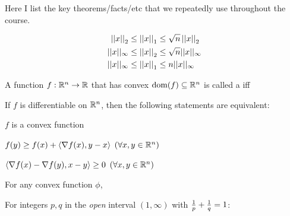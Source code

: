\documentclass[11pt]{article}
\renewcommand\vec[2][]{\bm{#2}_{#1}}
\begin{document}

Here I list the key theorems/facts/etc that we repeatedly use throughout the course. 

\begin{definition}
	\begin{align}
		\norm{x}
			&\leq \norm[1]{x} \leq \sqrt{n} \norm{x} \\
		\inftynorm{x} 
			&\leq \norm{x} \leq \sqrt{n}\inftynorm{x} \\
		\inftynorm{x} 
			&\leq \norm[1]{x} \leq n \inftynorm{x} \\
	\end{align}
\end{definition}

\begin{definition}
	A function $f : \R^n \to \R$ that has convex $\text{dom}(f) \subseteq \R^n$ is called a  iff

	If $f$ is differentiable on $\R^n$, then the following statements are equivalent:
	\begin{compactitem}
		\item $f$ is a convex function 
		
		\item $f(y) \geq f(x) + \innerprod{\nabla f(x)}{y - x}$ $(\forall x, y \in \R^n)$ 
		
		\item $\innerprod{\nabla f(x) - \nabla f(y)}{x - y} \geq 0$ $(\forall x, y \in \R^n)$
	\end{compactitem}

	
\end{definition}

\begin{definition}
	\graybox{
		|\langle \vec u, \vec v \rangle |^2 \leq \langle \vec u, \vec u \rangle \cdot \langle \vec v, \vec v \rangle
	}
\end{definition}

\begin{definition}
	For any convex function $\phi$,
\end{definition}

\begin{definition}
	For integers $p, q$ in the \textit{open} interval $(1, \infty)$ with $\inv{p} + \inv{q} = 1$:
\end{definition}
\end{document}
